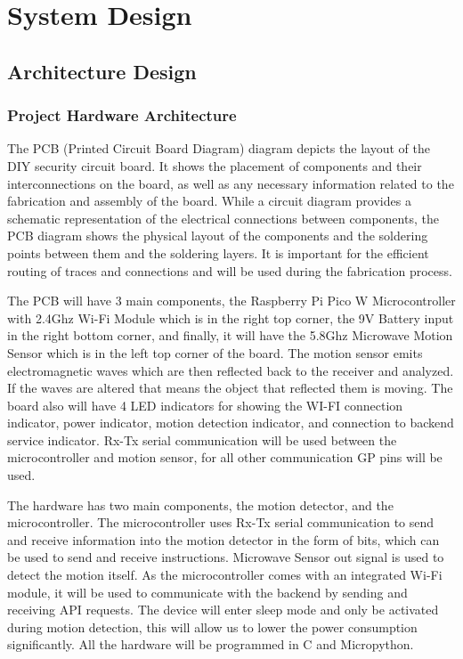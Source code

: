 \section{System Design}\label{sec:system-design}

\subsection{Architecture Design}\label{subsec:architecture-design}

\subsubsection{Project Hardware Architecture}



The PCB (Printed Circuit Board Diagram) diagram depicts the layout of the DIY security
circuit board. %
It shows the placement of components and their interconnections on the board, as well as any necessary information related to the fabrication and assembly of
the board. %
While a circuit diagram provides a schematic representation of the electrical connections between components, the PCB diagram shows the physical layout of the
components and the soldering points between them and the soldering layers. %
It is
important for the efficient routing of traces and connections and will be used during
the fabrication process. %

The PCB will have 3 main components, the Raspberry Pi Pico W Microcontroller with
2.4Ghz Wi-Fi Module which is in the right top corner, the 9V Battery input in the
right bottom corner, and finally, it will have the 5.8Ghz Microwave Motion Sensor
which is in the left top corner of the board. %
The motion sensor emits electromagnetic waves which are then reflected back to the receiver and analyzed. %
If the waves are altered that means the object that reflected them is moving. %
The board also will have 4 LED indicators for showing the WI-FI connection indicator, power indicator,
motion detection indicator, and connection to backend service indicator. %
Rx-Tx serial communication will be used between the microcontroller and motion sensor,
for all other communication GP pins will be used. %

The hardware has two main components, the motion detector, and the microcontroller. %
The microcontroller uses Rx-Tx serial communication to send and receive information
into the motion detector in the form of bits, which can be used to send and receive
instructions. %
Microwave Sensor out signal is used to detect the motion itself. %
As the microcontroller comes with an integrated Wi-Fi module, it will be used to communicate with the backend by sending and receiving API requests.
The device will enter sleep mode and only be activated during motion detection,
this will allow us to lower the power consumption significantly. %
All the hardware will be programmed in C and Micropython. %

